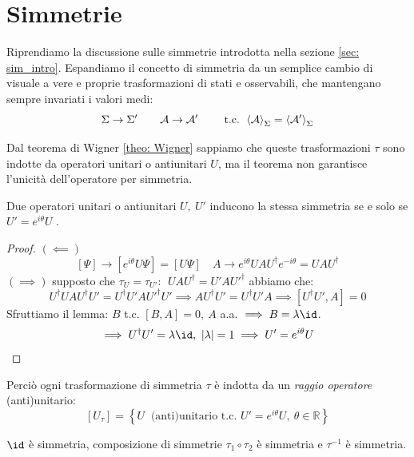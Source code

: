 \chapter{Simmetrie}

Riprendiamo la discussione sulle simmetrie introdotta nella sezione \ref{sec: sim_intro}. 
Espandiamo il concetto di simmetria da un semplice cambio di visuale a vere e proprie trasformazioni di stati e osservabili, che mantengano sempre invariati i valori medi:
\begin{equation}
    \Sigma\to \Sigma' \qquad \mathcal{A}\to \mathcal{A}' \qquad  \text{ t.c. } \expval{\mathcal{A}}_\Sigma  = \expval{\mathcal{A}'}_\Sigma
\end{equation}

Dal teorema di Wigner \ref{theo: Wigner} sappiamo che queste trasformazioni \(\tau\) sono indotte da operatori unitari o antiunitari \(U\), ma il teorema non garantisce l'unicità dell'operatore per simmetria.

\begin{theorem}
    Due operatori unitari o antiunitari \(U, \ U'\) inducono la stessa simmetria se e solo se \(U ' = e^{i\theta}U\) .
\end{theorem}
\begin{proof}
    \((\impliedby) \) 
    \[
        \left[ \Psi \right]\to \left[ e^{i\theta}U \Psi\right]= \left[ U\Psi \right] \quad A \to e^{i\theta}UAU^\dagger e ^{-i\theta}= UAU^\dagger
    \]
    \((\implies) \) supposto che \(\tau_U = \tau_{U'}: \ \ UAU^\dagger = U'AU'^\dagger\) abbiamo che:
    \[
       U^\dagger U A U^\dagger U'= U^\dagger U'A U'^\dagger U'  \implies AU^\dagger U'= U^\dagger U ' A
       \implies \left[ U^\dagger U', A \right]=0
    \] 
    Sfruttiamo il lemma: \(B\) t.c. \(\left[ B,A \right]= 0 , \ A \) a.a. \(\implies B = \lambda \id\).
    \[
        \implies U^\dagger U' = \lambda \id , \ \abs{\lambda} = 1 \implies U ' = e^{i\theta}U
    \]
\end{proof}
Perciò ogni trasformazione di simmetria \(\tau\) è indotta da un \textit{raggio operatore} (anti)unitario:
\begin{equation}
    \left[ U_\tau \right]= \left\{ U \ \text{ (anti)unitario t.c. } U' = e^{i\theta}U , \ \theta \in \mathbb{R}\right\}
\end{equation}

\begin{remark}
    \(\id\) è simmetria, composizione di simmetrie \(\tau_1 \circ \tau_2\) è simmetria e \(\tau^{-1}\) è simmetria.
\end{remark}


